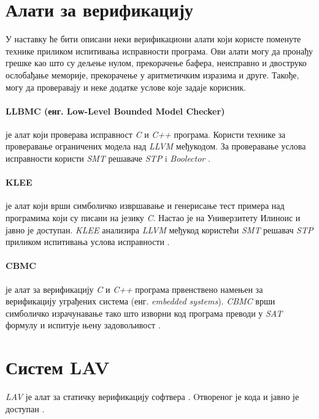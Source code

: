 \documentclass[12pt,oneside]{memoir}
\begin{document}
  \section{Алати за верификацију}
У наставку ће бити описани неки верификациони алати који користе поменуте технике приликом испитивања исправности програма. Ови алати могу да пронађу грешке као што су дељење нулом, прекорачење бафера, неисправно и двоструко ослобађање меморије, прекорачење у аритметичким изразима и друге. Такође, могу да проверавају и неке додатке услове које задаје корисник.

\paragraph{LLBMC (енг. Low-Level Bounded Model Checker)} је алат који проверава исправност 
\textit{C} и \textit{C++} програма. Користи технике за проверавање ограничених модела над \textit{LLVM} међукодом. За проверавање услова исправности користи \textit{SMT} решаваче \textit{STP} i \textit{Boolector} \cite{llbmc}.

\paragraph{KLEE} је алат који врши симболичко извршавање и генерисање тест примера над програмима који су писани на језику \textit{C}. Настао је на Универзитету Илиноис и јавно је доступан. \emph{KLEE} анализира \emph{LLVM} међукод користећи \textit{SMT} решавач \textit{STP} приликом испитивања услова исправности \cite{klee}. 

\paragraph{CBMC} је алат за верификацију \textit{C} и \textit{C++} програма првенствено намењен за верификацију уграђених система (енг. \textit{embedded systems}). \textit{CBMC} врши симболичко израчунавање тако што изворни код програма преводи у \textit{SAT} формулу и испитује њену задовољивост \cite{cbmc}. 

\section{Систем LAV}
	\textit{LAV} је алат за статичку верификацију софтвера \cite{mvjphd}. Oтвореног је кода и јавно је доступан \cite{lav_online}. 
	
\end{document}
